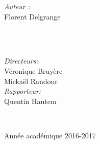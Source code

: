 \documentclass[12pt,a4paper]{report}
\theoremstyle{definition}%
\theoremstyle{remark}
\begin{document}
\begin{titlepage}
	\vspace{2cm}
	\begin{minipage}{0.4\textwidth}
		\begin{flushleft} \large
			\emph{Auteur :} \\Florent Delgrange
		\end{flushleft}
	\end{minipage}
	~
	\begin{minipage}{0.4\textwidth}
		\begin{flushright} \large
			\quad \\
			\emph{Directeurs:}\\ \quad Véronique Bruyère \\ \quad Mickaël Randour\\	\vspace*{0.5cm}
			\emph{Rapporteur:}\\
			Quentin Hautem
		\end{flushright}

	\end{minipage}\\[5cm]


	\vspace{3.1cm}
	\begin{center}
			Ann\'ee acad\'emique 2016-2017
	\end{center}


	\vspace*{1cm}



	\vfill %

\end{titlepage}
\end{document}
